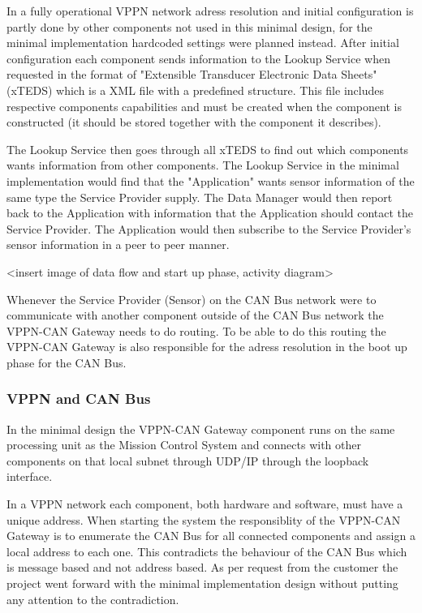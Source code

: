 In a fully operational VPPN network adress resolution and initial
configuration is partly done by other components not used in this minimal
design, for the minimal implementation hardcoded settings were planned instead.
After initial configuration each component sends information to the
Lookup Service when requested in the format of "Extensible Transducer Electronic Data Sheets"
(xTEDS) which is a XML file with a predefined structure. This file includes
respective components capabilities and must be created when the component is
constructed (it should be stored together with the component it describes).

The Lookup Service then goes through all xTEDS to find out which components wants
information from other components. The Lookup Service in the minimal
implementation would find that the "Application" wants sensor information of
the same type the Service Provider supply. The Data Manager would then report
back to the Application with information that the Application should contact
the Service Provider. The Application would then subscribe to the Service
Provider's sensor information in a peer to peer manner.

<insert image of data flow and start up phase, activity diagram>

Whenever the Service Provider (Sensor) on the CAN Bus network were to communicate
with another component outside of the CAN Bus network the VPPN-CAN Gateway
needs to do routing. To be able to do this routing the VPPN-CAN Gateway is also
responsible for the adress resolution in the boot up phase for the CAN Bus.

\subsubsection{VPPN and CAN Bus}\label{subsubsec:vppn_can_bus}
In the minimal design the VPPN-CAN Gateway component runs on the same
processing unit as the Mission Control System and connects with other
components on that local subnet through UDP/IP through the loopback interface.

In a VPPN network each component, both hardware and software, must have a unique
address. When starting the system the responsiblity of the VPPN-CAN Gateway is to
enumerate the CAN Bus for all connected components and assign a local address to
each one. This contradicts the behaviour of the CAN Bus which is message based
and not address based. As per request from the customer the project went
forward with the minimal implementation design without putting any attention to
the contradiction.

